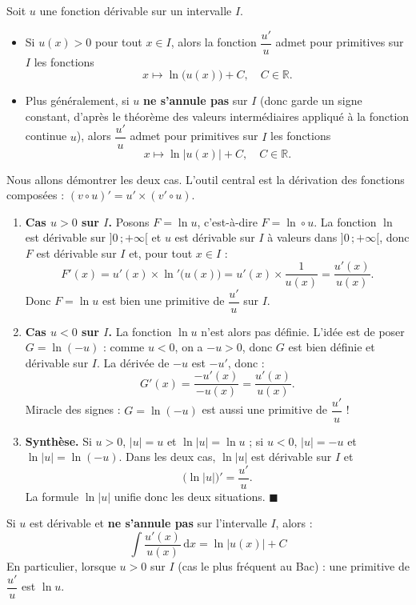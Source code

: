 \documentclass[11pt]{article}
\begin{document}
\begin{propriete}
Soit $u$ une fonction dérivable sur un intervalle $I$.
\begin{itemize}
\item Si $u(x) > 0$ pour tout $x \in I$, alors la fonction $\dfrac{u'}{u}$ admet pour primitives sur $I$ les fonctions
\[ x \longmapsto \ln\bigl(u(x)\bigr) + C, \quad C \in \mathbb{R}. \]
\item Plus généralement, si $u$ \textbf{ne s'annule pas} sur $I$ (donc garde un signe constant, d'après le théorème des valeurs intermédiaires appliqué à la fonction continue $u$), alors $\dfrac{u'}{u}$ admet pour primitives sur $I$ les fonctions
\[ x \longmapsto \ln\bigl|u(x)\bigr| + C, \quad C \in \mathbb{R}. \]
\end{itemize}
\end{propriete}

\begin{experience}
Nous allons démontrer les deux cas. L'outil central est la dérivation des fonctions composées : $(v \circ u)' = u' \times (v' \circ u)$.
\begin{enumerate}
\item \textbf{Cas $u > 0$ sur $I$.} Posons $F = \ln u$, c'est-à-dire $F = \ln \circ u$. La fonction $\ln$ est dérivable sur $]0\,;+\infty[$ et $u$ est dérivable sur $I$ à valeurs dans $]0\,;+\infty[$, donc $F$ est dérivable sur $I$ et, pour tout $x \in I$ :
\[ F'(x) = u'(x) \times \ln'\bigl(u(x)\bigr) = u'(x) \times \frac{1}{u(x)} = \frac{u'(x)}{u(x)}. \]
Donc $F = \ln u$ est bien une primitive de $\dfrac{u'}{u}$ sur $I$.
\item \textbf{Cas $u < 0$ sur $I$.} La fonction $\ln u$ n'est alors pas définie. L'idée est de poser $G = \ln(-u)$ : comme $u < 0$, on a $-u > 0$, donc $G$ est bien définie et dérivable sur $I$. La dérivée de $-u$ est $-u'$, donc :
\[ G'(x) = \frac{-u'(x)}{-u(x)} = \frac{u'(x)}{u(x)}. \]
Miracle des signes : $G = \ln(-u)$ est aussi une primitive de $\dfrac{u'}{u}$ !
\item \textbf{Synthèse.} Si $u > 0$, $|u| = u$ et $\ln|u| = \ln u$ ; si $u < 0$, $|u| = -u$ et $\ln|u| = \ln(-u)$. Dans les deux cas, $\ln|u|$ est dérivable sur $I$ et
\[ \bigl(\ln|u|\bigr)' = \frac{u'}{u}. \]
La formule $\ln|u|$ unifie donc les deux situations. $\blacksquare$
\end{enumerate}
\end{experience}

\begin{aretenir}
Si $u$ est dérivable et \textbf{ne s'annule pas} sur l'intervalle $I$, alors :
\[ \boxed{\;\int \frac{u'(x)}{u(x)}\,\mathrm{d}x = \ln\bigl|u(x)\bigr| + C\;} \]
En particulier, lorsque $u > 0$ sur $I$ (cas le plus fréquent au Bac) : une primitive de $\dfrac{u'}{u}$ est $\ln u$.
\end{aretenir}
\end{document}
